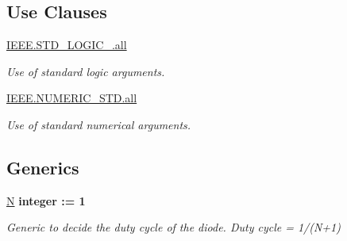 \subsection*{Use Clauses}
 \begin{DoxyCompactItemize}
\item 
\hypertarget{classRGB__diode__controller_a68c233289eaf7d2601307bdd93b4c299}{\hyperlink{classRGB__diode__controller_a68c233289eaf7d2601307bdd93b4c299}{I\-E\-E\-E.\-S\-T\-D\-\_\-\-L\-O\-G\-I\-C\-\_.\-all}   }\label{classRGB__diode__controller_a68c233289eaf7d2601307bdd93b4c299}

\begin{DoxyCompactList}\small\item\em Use of standard logic arguments. \end{DoxyCompactList}\item 
\hypertarget{classRGB__diode__controller_a7c135c43c66ccd7f22abe5f6211788a5}{\hyperlink{classRGB__diode__controller_a7c135c43c66ccd7f22abe5f6211788a5}{I\-E\-E\-E.\-N\-U\-M\-E\-R\-I\-C\-\_\-\-S\-T\-D.\-all}   }\label{classRGB__diode__controller_a7c135c43c66ccd7f22abe5f6211788a5}

\begin{DoxyCompactList}\small\item\em Use of standard numerical arguments. \end{DoxyCompactList}\end{DoxyCompactItemize}
\subsection*{Generics}
 \begin{DoxyCompactItemize}
\item 
\hypertarget{classRGB__diode__controller_ad3971b999c08c97da803416025fcebb0}{\hyperlink{classRGB__diode__controller_ad3971b999c08c97da803416025fcebb0}{N} {\bfseries {\bfseries \textcolor{comment}{integer}\textcolor{vhdlchar}{ }\textcolor{vhdlchar}{\-:}\textcolor{vhdlchar}{=}\textcolor{vhdlchar}{ } \textcolor{vhdldigit}{1} \textcolor{vhdlchar}{ }}}}\label{classRGB__diode__controller_ad3971b999c08c97da803416025fcebb0}

\begin{DoxyCompactList}\small\item\em Generic to decide the duty cycle of the diode. Duty cycle = 1/(N+1) \end{DoxyCompactList}\end{DoxyCompactItemize}
